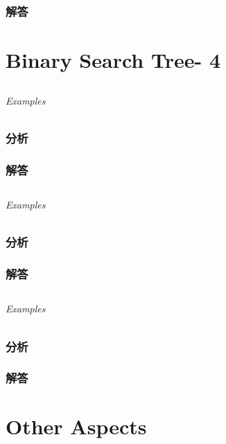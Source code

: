 \documentclass[UTF8,a4paper,12pt]{ctexbook}
\begin{document}
	\subsection{解答}
\chapter{Binary Search Tree- 4}
\section{}
	
	\subparagraph{Examples}
	
	\subsection{分析}
	
	\subsection{解答}
	
\section{}
	
	\subparagraph{Examples}
	
	\subsection{分析}
	
	\subsection{解答}
	
\section{}
	
	\subparagraph{Examples}
	
	\subsection{分析}
	
	\subsection{解答}

\chapter{Other Aspects}
\end{document}
